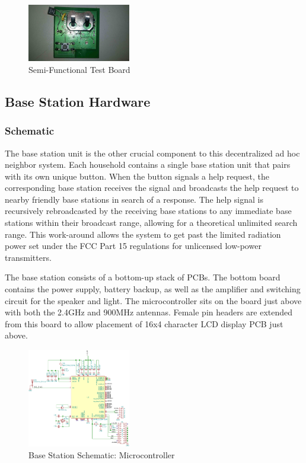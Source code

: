 \documentclass[journal,compsoc]{IEEEtran}
\begin{document}
\begin{figure}[H]
\centering
\includegraphics[width=0.4\textwidth]{moose2.jpg}
\caption{Semi-Functional Test Board}
\label{butttest}
\end{figure}

\subsection{Base Station Hardware}

\subsubsection{Schematic}

The base station unit is the other crucial component to this decentralized ad hoc neighbor system. Each household contains a single base station unit that pairs with its own unique button. When the button signals a help request, the corresponding base station receives the signal and broadcasts the help request to nearby friendly base stations in search of a response. The help signal is recursively rebroadcasted by the receiving base stations to any immediate base stations within their broadcast range, allowing for a theoretical unlimited search range. This work-around allows the system to get past the limited radiation power set under the FCC Part 15 regulations for unlicensed low-power transmitters.

The base station consists of a bottom-up stack of PCBs. The bottom board contains the power supply, battery backup, as well as the amplifier and switching circuit for the speaker and light. The microcontroller sits on the board just above with both the 2.4GHz and 900MHz antennas. Female pin headers are extended from this board to allow placement of 16x4 character LCD display PCB just above.

\begin{figure}[ht] 	%
\centering
\includegraphics[width=0.4\textwidth]{base-schematic-uc.png}
\caption{ \space Base Station Schematic: Microcontroller}
\label{base-sch-uc}
\end{figure}
\end{document}
